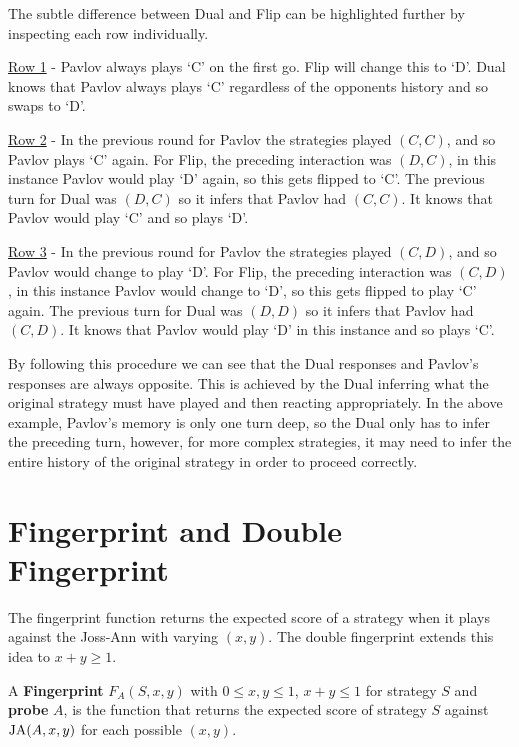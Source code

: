 The subtle difference between Dual and Flip can be highlighted further by inspecting each row individually.

\underline{Row 1} - Pavlov always plays `C' on the first go.
Flip will change this to `D'.
Dual knows that Pavlov always plays `C' regardless of the opponents history and so swaps to `D'.

\underline{Row 2} - In the previous round for Pavlov the strategies played $(C, C)$, and so Pavlov plays `C' again.
For Flip, the preceding interaction was $(D, C)$, in this instance Pavlov would play `D' again, so this gets flipped to `C'.
The previous turn for Dual was $(D, C)$ so it infers that Pavlov had $(C, C)$.
It knows that Pavlov would play `C' and so plays `D'.

\underline{Row 3} - In the previous round for Pavlov the strategies played $(C, D)$, and so Pavlov would change to play `D'.
For Flip, the preceding interaction was $(C, D)$, in this instance Pavlov would change to `D', so this gets flipped to play `C' again.
The previous turn for Dual was $(D, D)$ so it infers that Pavlov had $(C, D)$.
It knows that Pavlov would play `D' in this instance and so plays `C'.

By following this procedure we can see that the Dual responses and Pavlov's responses are always opposite.
This is achieved by the Dual inferring what the original strategy must have played and then reacting appropriately.
In the above example, Pavlov's memory is only one turn deep, so the Dual only has to infer the preceding turn, however, for more complex strategies, it may need to infer the entire history of the original strategy in order to proceed correctly.

\section{Fingerprint and Double Fingerprint}
The fingerprint function returns the expected score of a strategy when it plays against the Joss-Ann with varying $(x, y)$.
The double fingerprint extends this idea to $x+y \geq 1$.

\begin{definition}\label{def:fingerprint}
A \textbf{Fingerprint} $F_A(S, x, y)$ with $0 \leq x, y \leq 1$, $x+y \leq 1$ for strategy $S$ and \textbf{probe} $A$, is the function that returns the expected score of strategy $S$ against $\text{JA}(A, x, y)$ for each possible $(x, y)$.
\end{definition}

